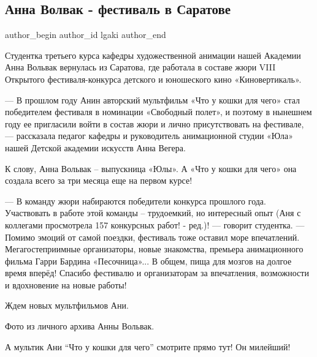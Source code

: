  
 
 
 
 
\subsection{Анна Волвак - фестиваль в Саратове}
\label{sec:15_10_2021.vk.lgaki.1.anna_volvak_festival_saratov}


\ifcmt
 author_begin
   author_id lgaki
 author_end
\fi

Студентка третьего курса кафедры художественной анимации нашей Академии Анна
Вольвак вернулась из Саратова, где работала в составе жюри VIII Открытого
фестиваля-конкурса детского и юношеского кино «Киновертикаль».

— В прошлом году Анин авторский мультфильм «Что у кошки для чего» стал
победителем фестиваля в номинации «Свободный полет», и поэтому в нынешнем году
ее пригласили войти в состав жюри и лично присутствовать на фестивале, —
рассказала педагог кафедры и руководитель анимационной студии «Юла» нашей
Детской академии искусств Анна Вегера.

К слову, Анна Вольвак – выпускница «Юлы». А «Что у кошки для чего» она создала
всего за три месяца еще на первом курсе!

— В команду жюри набираются победители конкурса прошлого года. Участвовать в
работе этой команды – трудоемкий, но интересный опыт (Аня с коллегами
просмотрела 157 конкурсных работ! - ред.)! — говорит студентка. — Помимо эмоций
от самой поездки, фестиваль тоже оставил море впечатлений. Мегагостеприимные
организаторы, новые знакомства, премьера анимационного фильма Гарри Бардина
«Песочница»... В общем, пища для мозгов на долгое время вперёд! Спасибо
фестивалю и организаторам за впечатления, возможности и вдохновение на новые
работы!

Ждем новых мультфильмов Ани.

Фото из личного архива Анны Вольвак.

А мультик Ани \enquote{Что у кошки для чего} смотрите прямо тут! Он милейший!
